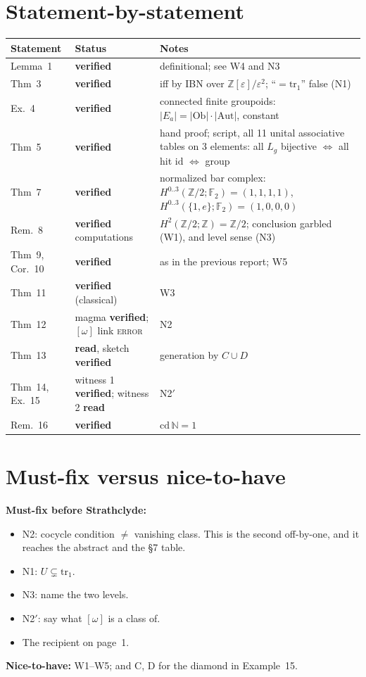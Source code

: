 \documentclass[11pt]{article}
\newcommand{\Z}{\mathbb{Z}}
\newcommand{\N}{\mathbb{N}}
\newcommand{\F}{\mathbb{F}}
\newcommand{\iss}[1]{\textsc{#1}}
\begin{document}
\section{Statement-by-statement}
\begin{center}\small
\begin{tabular}{p{2.3cm}p{2.6cm}p{10.3cm}}
\toprule
Statement & Status & Notes\\\midrule
Lemma~1 & \textbf{verified} & definitional; see W4 and N3\\
Thm~3 & \textbf{verified} & iff by IBN over $\Z[\varepsilon]/\varepsilon^2$; ``$=\mathrm{tr}_1$'' false (N1)\\
Ex.~4 & \textbf{verified} & connected finite groupoids: $|E_a|=|\mathrm{Ob}|\cdot|\mathrm{Aut}|$, constant\\
Thm~5 & \textbf{verified} & hand proof; script, all 11 unital associative tables on 3 elements: all $L_g$ bijective $\Leftrightarrow$ all hit $\mathrm{id}$ $\Leftrightarrow$ group\\
Thm~7 & \textbf{verified} & normalized bar complex: $H^{0..3}(\Z/2;\F_2)=(1,1,1,1)$, $H^{0..3}(\{1,e\};\F_2)=(1,0,0,0)$\\
Rem.~8 & \textbf{verified} computations & $H^2(\Z/2;\Z)=\Z/2$; conclusion garbled (W1), and level sense (N3)\\
Thm~9, Cor.~10 & \textbf{verified} & as in the previous report; W5\\
Thm~11 & \textbf{verified} (classical) & W3\\
Thm~12 & magma \textbf{verified}; $[\omega]$ link \iss{error} & N2\\
Thm~13 & \textbf{read}, sketch \textbf{verified} & generation by $C\cup D$\\
Thm~14, Ex.~15 & witness 1 \textbf{verified}; witness 2 \textbf{read} & N2$'$\\
Rem.~16 & \textbf{verified} & $\mathrm{cd}\,\N=1$\\
\bottomrule
\end{tabular}
\end{center}

\section*{Must-fix versus nice-to-have}
\textbf{Must-fix before Strathclyde:}
\begin{itemize}[leftmargin=1.2em]
\item N2: cocycle condition $\neq$ vanishing class. This is the second off-by-one, and it reaches
the abstract and the \S7 table.
\item N1: $U\subsetneq\mathrm{tr}_1$.
\item N3: name the two levels.
\item N2$'$: say what $[\omega]$ is a class of.
\item The recipient on page~1.
\end{itemize}
\textbf{Nice-to-have:} W1--W5; and C, D for the diamond in Example~15.
\end{document}
